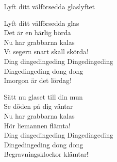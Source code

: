 \begin{song}{Lyft ditt välförsedda glas}{lyftet}
\begin{vers}
Lyft ditt välförsedda glas\\
Det är en härlig börda\\
Nu har grabbarna kalas\\
Vi segern snart skall skörda!\\
\repopen Ding dingedingeding Dingedingeding\\
Dingedingeding dong dong\\
Imorgon är det lördag! \repclose\\
\end{vers}
\begin{vers}
Sätt nu glaset till din mun\\
Se döden på dig väntar\\
Nu har grabbarna kalas\\
Hör liemannen flämta!\\
\repopen Ding dingedingeding Dingedingeding\\
Dingedingeding dong dong\\
Begravningsklockor klämtar! \repclose\\
\end{vers}
\end{song}
